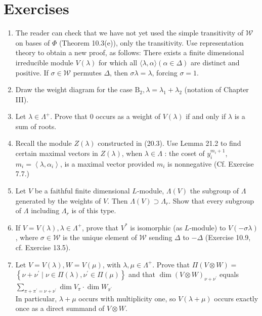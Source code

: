 \documentclass[10pt]{article}
\begin{document}
\section*{Exercises}
\begin{enumerate}
  \item The reader can check that we have not yet used the simple transitivity of $\mathscr{W}$ on bases of $\Phi$ (Theorem 10.3(e)), only the transitivity. Use representation theory to obtain a new proof, as follows: There exists a finite dimensional irreducible module $V(\lambda)$ for which all $\langle\lambda, \alpha\rangle(\alpha \in \Delta)$ are distinct and positive. If $\sigma \in \mathscr{W}$ permutes $\Delta$, then $\sigma \lambda=\lambda$, forcing $\sigma=1$.
  \item Draw the weight diagram for the case $\mathrm{B}_{2}, \lambda=\lambda_{1}+\lambda_{2}$ (notation of Chapter III).
  \item Let $\lambda \in \Lambda^{+}$. Prove that 0 occurs as a weight of $V(\lambda)$ if and only if $\lambda$ is a sum of roots.
  \item Recall the module $Z(\lambda)$ constructed in (20.3). Use Lemma 21.2 to find certain maximal vectors in $Z(\lambda)$, when $\lambda \in \Lambda$ : the coset of $y_{i}^{m_{i}+1}$, $m_{i}=\left\langle\lambda, \alpha_{i}\right\rangle$, is a maximal vector provided $m_{i}$ is nonnegative (Cf. Exercise 7.7.)
  \item Let $V$ be a faithful finite dimensional $L$-module, $\Lambda(V)$ the subgroup of $\Lambda$ generated by the weights of $V$. Then $\Lambda(V) \supset \Lambda_{r}$. Show that every subgroup of $\Lambda$ including $\Lambda_{r}$ is of this type.
  \item If $V=V(\lambda), \lambda \in \Lambda^{+}$, prove that $V^{*}$ is isomorphic (as $L$-module) to $V(-\sigma \lambda)$, where $\sigma \in \mathscr{W}$ is the unique element of $\mathscr{W}$ sending $\Delta$ to $-\Delta$ (Exercise 10.9, cf. Exercise 13.5).
  \item Let $V=V(\lambda), W=V(\mu)$, with $\lambda, \mu \in \Lambda^{+}$. Prove that $\Pi(V \otimes W)=$ $\left\{\nu+\nu^{\prime} \mid \nu \in \Pi(\lambda), \nu^{\prime} \in \Pi(\mu)\right\}$ and that $\operatorname{dim}(V \otimes W)_{\nu+\nu^{\prime}}$ equals $\sum_{\pi+\pi^{\prime}=\nu+\nu^{\prime}} \operatorname{dim} V_{\pi} \cdot \operatorname{dim} W_{\pi^{\prime}}$\\
In particular, $\lambda+\mu$ occurs with multiplicity one, so $V(\lambda+\mu)$ occurs exactly once as a direct summand of $V \otimes W$.

\end{enumerate}
\end{document}
